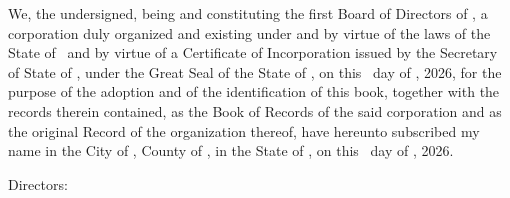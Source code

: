 
\bigskip

We, the undersigned, being and constituting the first Board of Directors of \companyName,
a corporation duly organized and existing under and by virtue of the laws of the State of
\companyState\ and by virtue of a Certificate of Incorporation issued by the Secretary of
State of \companyState, under the Great Seal of the State of \companyState, on this \dayOne\
day of \monthOne, 2026, for the purpose of the adoption and of the identification of this
book, together with the records therein contained, as the Book of Records of the said
corporation and as the original Record of the organization thereof, have hereunto subscribed
my name in the City of \city, County of \county, in the State of \companyState, on this
\dayTwo\ day of \monthTwo, 2026.

\bigskip
\noindent Directors:

\sigpair{\directorOne}{\directorTwo}
\sigpair{\directorThree}{\directorFour}
\sigpair{\directorFive}{\directorSix}
